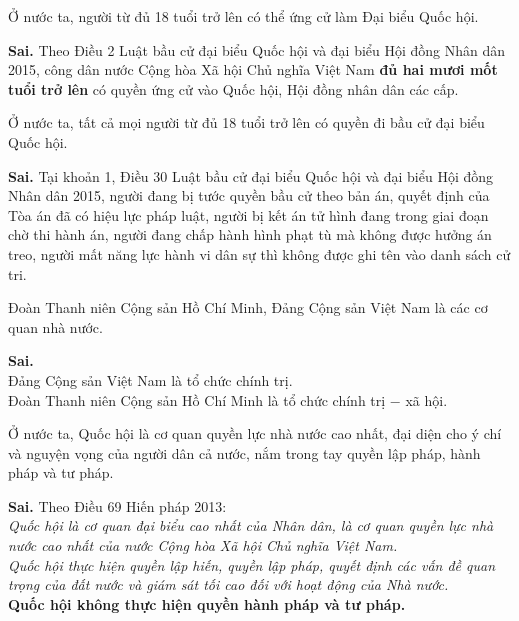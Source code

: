 \begin{ques}
Ở nước ta, người từ đủ 18 tuổi trở lên có thể ứng cử làm Đại biểu Quốc hội.
\end{ques}
\begin{ans}
\textbf{Sai.} Theo Điều 2 Luật bầu cử đại biểu Quốc hội và đại biểu Hội đồng Nhân dân 2015, công dân nước Cộng hòa Xã hội Chủ nghĩa Việt Nam \textbf{đủ hai mươi mốt tuổi trở lên} có quyền ứng cử vào Quốc hội, Hội đồng nhân dân các cấp.
\end{ans}

\begin{ques}
Ở nước ta, tất cả mọi người từ đủ 18 tuổi trở lên có quyền đi bầu cử đại biểu Quốc hội.
\end{ques}
\begin{ans}
\textbf{Sai.} Tại khoản 1, Điều 30 Luật bầu cử đại biểu Quốc hội và đại biểu Hội đồng Nhân dân 2015, người đang bị tước quyền bầu cử theo bản án, quyết định của Tòa án đã có hiệu lực pháp luật, người bị kết án tử hình đang trong giai đoạn chờ thi hành án, người đang chấp hành hình phạt tù mà không được hưởng án treo, người mất năng lực hành vi dân sự thì không được ghi tên vào danh sách cử tri.
\end{ans}

\begin{ques}
Đoàn Thanh niên Cộng sản Hồ Chí Minh, Đảng Cộng sản Việt Nam là các cơ quan nhà nước.
\end{ques}
\begin{ans}
\textbf{Sai.}\\
Đảng Cộng sản Việt Nam là tổ chức chính trị.\\
Đoàn Thanh niên Cộng sản Hồ Chí Minh là tổ chức chính trị $-$ xã hội.
\end{ans}

\begin{ques}
Ở nước ta, Quốc hội là cơ quan quyền lực nhà nước cao nhất, đại diện cho ý chí và nguyện vọng của người dân cả nước, nắm trong tay quyền lập pháp, hành pháp và tư pháp.
\end{ques}
\begin{ans}
\textbf{Sai.} Theo Điều 69 Hiến pháp 2013:\\
\textit{Quốc hội là cơ quan đại biểu cao nhất của Nhân dân, là cơ quan quyền lực nhà nước cao nhất của nước Cộng hòa Xã hội Chủ nghĩa Việt Nam.}\\
\textit{Quốc hội thực hiện quyền lập hiến, quyền lập pháp, quyết định các vấn đề quan trọng của đất nước và giám sát tối cao đối với hoạt động của Nhà nước.}\\
\textbf{Quốc hội không thực hiện quyền hành pháp và tư pháp.}
\end{ans}

